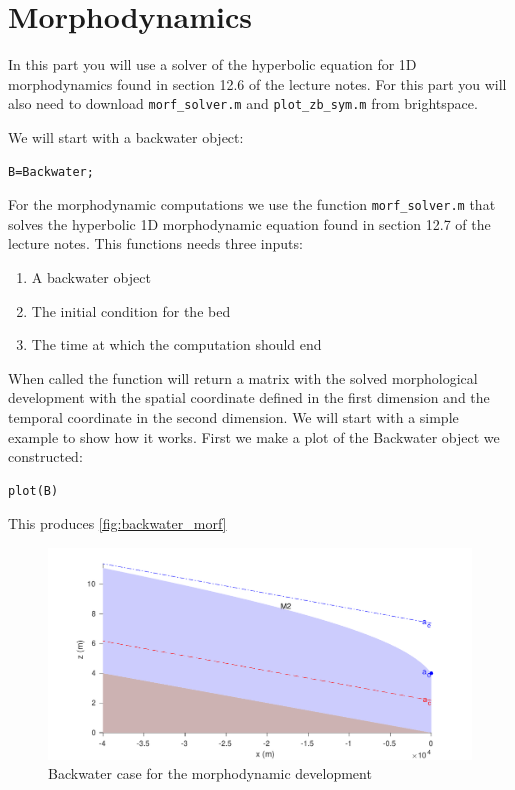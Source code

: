 \documentclass[a4paper]{article}
\begin{document}
\section{Morphodynamics}
In this part you will use a solver of the hyperbolic equation for 1D morphodynamics found in section 12.6 of the lecture notes. For this part you will also need to download \lstinline{morf_solver.m} and \lstinline{plot_zb_sym.m} from brightspace.

We will start with a backwater object:
\begin{lstlisting}
B=Backwater;
\end{lstlisting}
For the morphodynamic computations we use the function \lstinline{morf_solver.m} that solves the hyperbolic 1D morphodynamic equation found in section 12.7 of the lecture notes.
This functions needs three inputs:
\begin{enumerate}
  \item A backwater object
  \item The initial condition for the bed
  \item The time at which the computation should end
\end{enumerate}
When called the function will return a matrix with the solved morphological development with the spatial coordinate defined in the first dimension and the temporal coordinate in the second dimension.
We will start with a simple example to show how it works. 
First we make a plot of the Backwater object we constructed:
\begin{lstlisting}
plot(B)
\end{lstlisting}
This produces \autoref{fig:backwater_morf}
\begin{figure}[ht]
  \centering
  \includegraphics[width=\linewidth]{matlab/backwater_morf}
  \caption{Backwater case for the morphodynamic development}
  \label{fig:backwater_morf}
\end{figure}
\end{document}
